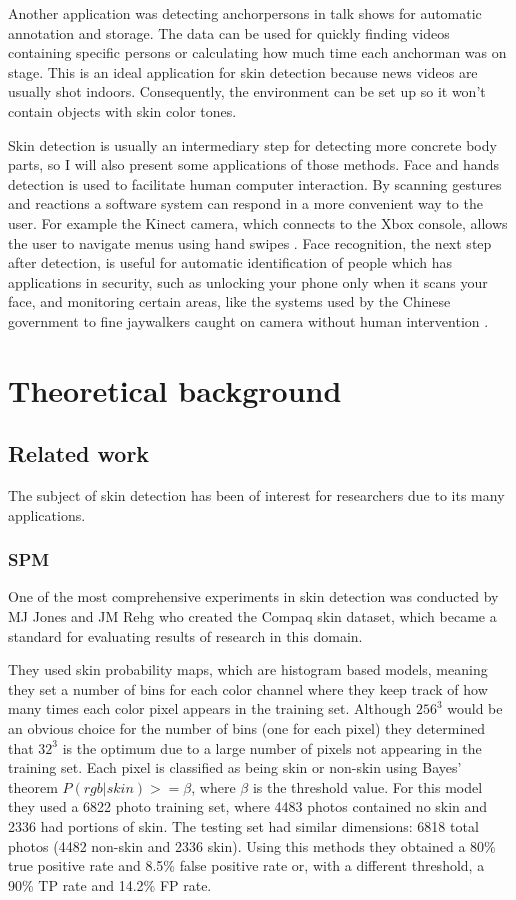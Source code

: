 \documentclass[12pt]{report}
\begin{document}
	Another application was detecting anchorpersons in talk shows \cite{anchor_person_detection} for automatic annotation and storage. The data can be used for quickly finding videos containing specific persons or calculating how much time each anchorman was on stage. This is an ideal application for skin detection because news videos are usually shot indoors. Consequently, the environment can be set up so it won't contain objects with skin color tones.
	
	Skin detection is usually an intermediary step for detecting more concrete body parts, so I will also present some applications of those methods. Face and hands detection is used to facilitate human computer interaction. By scanning gestures and reactions a software system can respond in a more convenient way to the user. For example the Kinect camera, which connects to the Xbox console,
	allows the user to navigate menus using hand swipes \cite{kinect_control}. Face recognition, the next step after detection, is useful for automatic identification of people \cite{detecting_faces_a_survey} which has applications in security, such as unlocking your phone only when it scans your face, and monitoring certain areas, like the systems used by the Chinese government to fine jaywalkers caught on camera without human intervention \cite{jaywalkers_china}.
	
	\chapter{Theoretical background}
	
	\section{Related work}
	The subject of skin detection has been of interest for researchers due to its many applications. 
	
	\subsection{SPM}
	One of the most comprehensive experiments in skin detection was conducted by MJ Jones and JM Rehg\cite{compaq} who created the Compaq skin dataset, which became a standard for evaluating results of research in this domain.
	
	They used skin probability maps, which are histogram based models, meaning they set a number of bins for each color channel where they keep track of how many times each color pixel appears in the training set. Although \(256^3\) would be an obvious choice for the number of bins (one for each pixel) they determined that \(32^3\) is the optimum due to a large number of pixels not appearing in the training set. Each pixel is classified as being skin or non-skin using Bayes' theorem \(P(rgb|skin) >= \beta\), where $\beta$ is the threshold value. For this model they used a 6822 photo training set, where 4483 photos contained no skin and 2336 had portions of skin. The testing set had similar dimensions: 6818 total photos (4482 non-skin and 2336 skin). Using this methods they obtained a 80\% true positive rate and 8.5\% false positive rate or, with a different threshold, a 90\% TP rate and 14.2\% FP rate.
	
\end{document}
